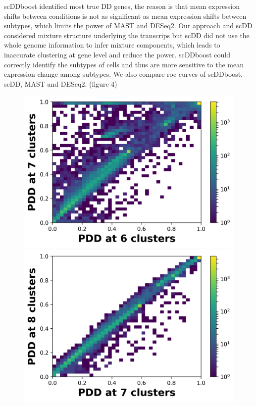 \documentclass[11pt]{amsart}
\begin{document}
scDDboost identified most true DD genes, the reason is that mean expression shifts between conditions is not as significant as mean expression shifts between subtypes, which limits the power of MAST and DESeq2. Our approach and scDD considered mixture structure underlying the transcrips but scDD did not use the whole genome information to infer mixture components, which leads to inaccurate clustering at gene level and reduce the power. scDDboost could correctly identify the subtypes of cells and thus are more sensitive to the mean expression change among subtypes. We also compare roc curves of scDDboost, scDD, MAST and DESeq2. (figure 4)
\begin{figure}[h]
\vspace{-\parskip}
  \includegraphics[width=\textwidth]{sim_67.png}
\endminipage\hfill
{}
  \includegraphics[width=\textwidth]{sim_78.png}

\end{figure}
\end{document}
